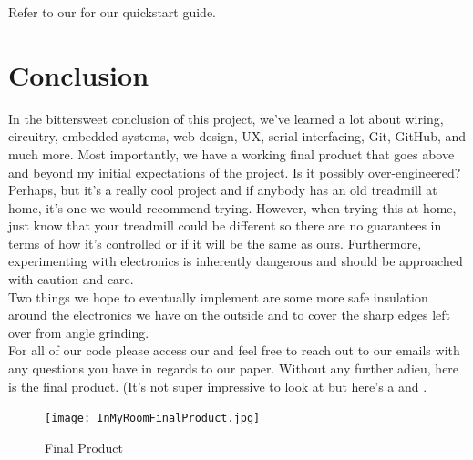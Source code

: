 \documentclass[journal]{IEEEtran}
\newcommand{\MYhref}[3][blue]{\href{#2}{\color{#1}{#3}}}%
\begin{document}
Refer to our \MYhref{https://github.com/Leo-Berman/Treadmill-To-Walking-Pad/blob/04a683261e5eefc8c90345b094c1a1721491e781/README.md}{GitHub Readme} for our quickstart guide.

\section{Conclusion}
\indent In the bittersweet conclusion of this project, we've learned a lot about wiring, circuitry, embedded systems, web design, UX, serial interfacing, Git, GitHub, and much more. Most importantly, we have a working final product that goes above and beyond my initial expectations of the project. Is it possibly over-engineered? Perhaps, but it's a really cool project and if anybody has an old treadmill at home, it's one we would recommend trying. However, when trying this at home, just know that your treadmill could be different so there are no guarantees in terms of how it's controlled or if it will be the same as ours. Furthermore, experimenting with electronics is inherently dangerous and should be approached with caution and care.\\
\indent Two things we hope to eventually implement are some more safe insulation around the electronics we have on the outside and to cover the sharp edges left over from angle grinding.\\
\indent For all of our code please access our \MYhref{https://github.com/Leo-Berman/Treadmill-To-Walking-Pad.git}{GitHub Repository} and feel free to reach out to our emails with any questions you have in regards to our paper. Without any further adieu, here is the final product. (It's not super impressive to look at but here's a \MYhref{https://drive.google.com/file/d/1rSkrefvcTBKX7KH033j2z0Tslr1Mf0Wk/view?usp=drive_link}{demo video of Leo doing math on the treadmill} and \MYhref{https://drive.google.com/file/d/1RXOLTaLV5otzCxjDomMnXNWlTBuZ_7U1/view?usp=drive_link}{Liam showing off the user interface}.

\pagebreak


\begin{figure} [!h]
\centering
\texttt{[image: InMyRoomFinalProduct.jpg]}
\caption{Final Product}
  \label{Fig: 9l}
\end{figure}
    
\end{document}

